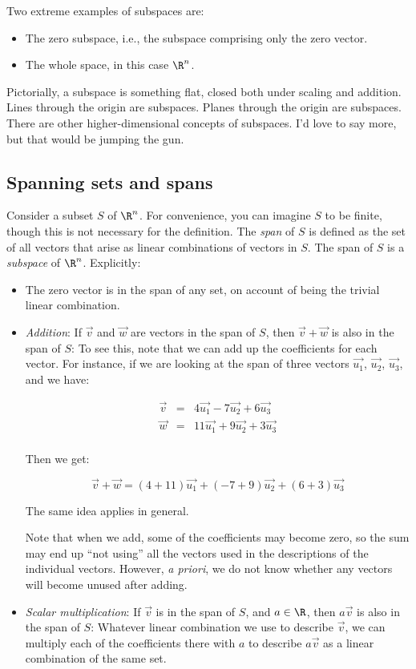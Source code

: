 \documentclass[10pt]{amsart}
\begin{document}
Two extreme examples of subspaces are:

\begin{itemize}
\item The zero subspace, i.e., the subspace comprising only the zero vector.
\item The whole space, in this case $\R^n$.
\end{itemize}

Pictorially, a subspace is something flat, closed both under scaling
and addition. Lines through the origin are subspaces. Planes through
the origin are subspaces. There are other higher-dimensional concepts
of subspaces. I'd love to say more, but that would be jumping the gun.

\subsection{Spanning sets and spans}

Consider a subset $S$ of $\R^n$. For convenience, you can imagine $S$
to be finite, though this is not necessary for the definition. The
{\em span} of $S$ is defined as the set of all vectors that arise as
linear combinations of vectors in $S$. The span of $S$ is a {\em
  subspace} of $\R^n$. Explicitly:

\begin{itemize}
\item The zero vector is in the span of any set, on account of being
  the trivial linear combination.
\item {\em Addition}: If $\vec{v}$ and $\vec{w}$ are vectors in the
  span of $S$, then $\vec{v} + \vec{w}$ is also in the span of $S$: To
  see this, note that we can add up the coefficients for each
  vector. For instance, if we are looking at the span of three vectors
  $\vec{u_1}$, $\vec{u_2}$, $\vec{u_3}$, and we have:

  \begin{eqnarray*}
    \vec{v} & = & 4\vec{u_1} - 7\vec{u_2} + 6\vec{u_3}\\
    \vec{w} & = & 11\vec{u_1} + 9\vec{u_2} + 3\vec{u_3}\\
  \end{eqnarray*}
  
  Then we get:

  $$\vec{v} + \vec{w} = (4 + 11)\vec{u_1} + (-7 + 9)\vec{u_2} + (6 + 3)\vec{u_3}$$

  The same idea applies in general.

  Note that when we add, some of the coefficients may become zero, so
  the sum may end up ``not using'' all the vectors used in the
  descriptions of the individual vectors. However, {\em a priori}, we
  do not know whether any vectors will become unused after adding.
\item {\em Scalar multiplication}: If $\vec{v}$ is in the span of $S$,
  and $a \in \R$, then $a\vec{v}$ is also in the span of $S$: Whatever
  linear combination we use to describe $\vec{v}$, we can multiply
  each of the coefficients there with $a$ to describe $a\vec{v}$ as a
  linear combination of the same set.
\end{itemize}
\end{document}
